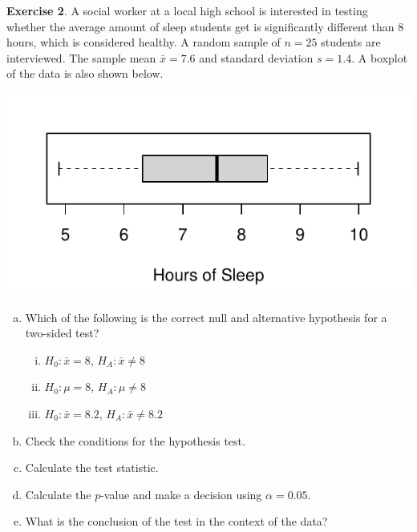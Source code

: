 \documentclass[10pt]{article}\usepackage[]{graphicx}\usepackage[]{color}
\begin{document}
\newpage

% 




\textbf{Exercise 2}.  A social worker at a local high school is interested in testing whether the average amount of sleep students get is significantly different than 8 hours, which is considered healthy. A random sample of $n=25$ students are interviewed.  The sample mean $\bar{x}=7.6$ and standard deviation $s=1.4$.  A boxplot of the data is also shown below.

\includegraphics[scale = 0.6]{figure/boxplot_sleep.pdf}

\begin{enumerate}[(a)]
\item Which of the following is the correct null and alternative hypothesis for a two-sided test?
\begin{enumerate}[(i)]
\item $H_0: \bar{x} = 8$, $H_A: \bar{x} \neq 8$
\item $H_0: \mu = 8$, $H_A: \mu \neq 8$
\item $H_0: \bar{x} = 8.2$, $H_A: \bar{x} \neq 8.2$\\
\end{enumerate}

\item Check the conditions for the hypothesis test.
\vspace{3cm}

\item Calculate the test statistic.
\vspace{3cm}

\item Calculate the $p$-value and make a decision using $\alpha=0.05$.
\vspace{3cm}

\item What is the conclusion of the test in the context of the data?
\end{enumerate}

\end{document}
